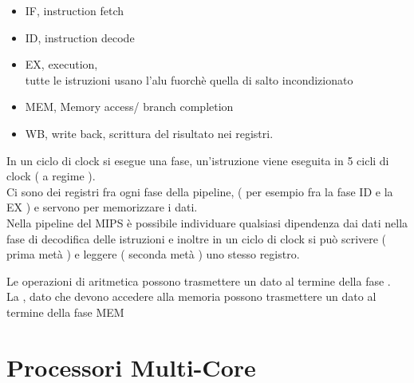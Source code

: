 \documentclass[arch.tex]{subfiles}
\begin{document}
\begin{itemize}
	\item IF, instruction fetch
	\item ID, instruction decode
	\item EX, execution,\\
		tutte le istruzioni usano l'alu fuorchè quella di salto incondizionato
	\item MEM, Memory access/ branch completion
	\item WB, write back, scrittura del risultato nei registri.
\end{itemize}
In un ciclo di clock si esegue una fase, un'istruzione viene eseguita in 5 cicli di clock 
( a regime ).\\
Ci sono dei registri fra ogni fase della pipeline, ( per esempio fra la fase ID e la EX ) e 
servono per memorizzare i dati.\\
Nella pipeline del MIPS è possibile individuare qualsiasi dipendenza dai dati nella fase di 
decodifica delle istruzioni e inoltre in un ciclo di clock si può scrivere ( prima metà ) e
leggere ( seconda metà ) uno stesso registro.

%
\label{ppar:Note per gli esercizi}
Le operazioni di aritmetica  possono trasmettere un dato al termine della fase
.\\
La , dato che devono accedere alla memoria possono trasmettere un dato al 
termine della fase MEM

\section{Processori Multi-Core}%
\label{sec:processori_multi_core}
\end{document}
